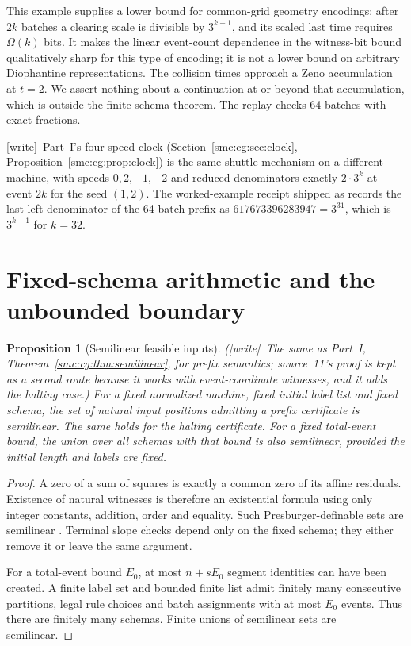 \documentclass[11pt,letterpaper]{article}
\numberwithin{equation}{section}
\newtheorem{proposition}[theorem]{Proposition}
\theoremstyle{definition}
\theoremstyle{remark}
\newcommand{\wtag}{\textup{[write]}}
\begin{document}
This example supplies a lower bound for common-grid geometry encodings: after $2k$ batches a clearing scale is divisible by $3^{k-1}$, and its scaled last time requires $\Omega(k)$ bits. It makes the linear event-count dependence in the witness-bit bound qualitatively sharp for this type of encoding; it is not a lower bound on arbitrary Diophantine representations. The collision times approach a Zeno accumulation at $t=2$. We assert nothing about a continuation at or beyond that accumulation, which is outside the finite-schema theorem. The replay checks 64 batches with exact fractions.


\wtag\ Part~I's four-speed clock (Section~\ref{smc:cg:sec:clock}, Proposition~\ref{smc:cg:prop:clock}) is the same shuttle mechanism on a different machine, with speeds $0,2,-1,-2$ and reduced denominators exactly $2\cdot3^k$ at event $2k$ for the seed $(1,2)$. The worked-example receipt shipped as  records the last left denominator of the 64-batch prefix as $617673396283947=3^{31}$, which is $3^{k-1}$ for $k=32$.

\section{Fixed-schema arithmetic and the unbounded boundary}\label{smc:sd:sec:fixed}
\begin{proposition}[Semilinear feasible inputs]\label{smc:sd:prop:semilinear}
(\wtag\ The same as Part~I, Theorem~\ref{smc:cg:thm:semilinear}, for prefix semantics; source~11's proof is kept as a second route because it works with event-coordinate witnesses, and it adds the halting case.) For a fixed normalized machine, fixed initial label list and fixed schema, the set of natural input positions admitting a prefix certificate is semilinear. The same holds for the halting certificate. For a fixed total-event bound, the union over all schemas with that bound is also semilinear, provided the initial length and labels are fixed.
\end{proposition}
\begin{proof}
A zero of a sum of squares is exactly a common zero of its affine residuals. Existence of natural witnesses is therefore an existential formula using only integer constants, addition, order and equality. Such Presburger-definable sets are semilinear \cite[Theorem~1.3]{ginsburgspanier}. Terminal slope checks depend only on the fixed schema; they either remove it or leave the same argument.

For a total-event bound $E_0$, at most $n+sE_0$ segment identities can have been created. A finite label set and bounded finite list admit finitely many consecutive partitions, legal rule choices and batch assignments with at most $E_0$ events. Thus there are finitely many schemas. Finite unions of semilinear sets are semilinear.
\end{proof}
\end{document}
